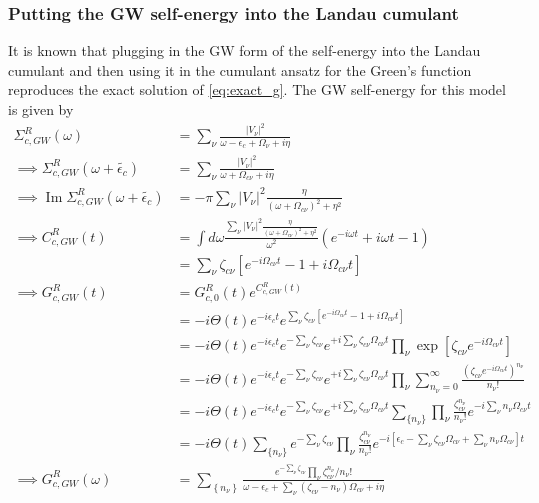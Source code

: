 \subsubsection{Putting the GW self-energy into the Landau cumulant}
 It is known that plugging in the GW form of the self-energy into the Landau cumulant and then using it in the cumulant ansatz for the Green's function reproduces the exact solution of \ref{eq:exact_g}. The GW self-energy for this model is given by
\begin{align}
    \Sigma^R_{c,GW}(\omega) &= \sum_\nu \frac{|V_\nu|^2}{\omega - \epsilon_c + \Omega_\nu + i\eta}\\
\implies \Sigma^R_{c,GW}(\omega+\tilde{\epsilon_c}) &= \sum_\nu \frac{|V_\nu|^2}{\omega + \Omega_{c\nu} + i\eta} \\
\implies \operatorname{Im} \Sigma^R_{c,GW}(\omega+\tilde{\epsilon_c}) &= -\pi \sum_\nu |V_\nu|^2 \frac{\eta}{(\omega + \Omega_{c\nu})^2 + \eta^2} \\
\implies C^R_{c,GW}(t) &= \int d\omega \frac{\sum_\nu |V_\nu|^2 \frac{\eta}{(\omega + \Omega_{c\nu})^2 + \eta^2}}{\omega^2} \left( e^{-i\omega t} + i\omega t - 1 \right)\\
&= \sum_{\nu} \zeta_{c\nu} \left[ e^{-i\Omega_{c\nu} t} - 1 + i\Omega_{c\nu} t \right]
\label{eq:Cpp_2} \\
\implies G^R_{c,GW}(t) &= G_{c,0}^R(t) e^{C_{c,GW}^R(t)} \\
&=
-i\Theta(t)e^{-i\epsilon_c t}
e^{\sum_{\nu}\zeta_{c\nu}
\left[
e^{-i\Omega_{c\nu}t}
-1
+i\Omega_{c\nu}t
\right]}
\\
&=
-i\Theta(t)e^{-i\epsilon_c t}
e^{-\sum_\nu \zeta_{c\nu}}
e^{+i\sum_\nu \zeta_{c\nu}\Omega_{c\nu}t}
\prod_\nu
\exp\left[
\zeta_{c\nu}e^{-i\Omega_{c\nu}t}
\right]
\\
&=
-i\Theta(t)e^{-i\epsilon_c t}
e^{-\sum_\nu \zeta_{c\nu}}
e^{+i\sum_\nu \zeta_{c\nu}\Omega_{c\nu}t}
\prod_\nu
\sum_{n_\nu=0}^{\infty}
\frac{
\left(
\zeta_{c\nu}e^{-i\Omega_{c\nu}t}
\right)^{n_\nu}
}{n_\nu!}
\\
&=
-i\Theta(t)e^{-i\epsilon_c t}
e^{-\sum_\nu \zeta_{c\nu}}
e^{+i\sum_\nu \zeta_{c\nu}\Omega_{c\nu}t}
\sum_{\{n_\nu\}}
\prod_\nu
\frac{\zeta_{c\nu}^{n_\nu}}{n_\nu!}
e^{-i\sum_\nu n_\nu\Omega_{c\nu}t}
\\
&=
-i \Theta(t)
\sum_{\{n_\nu\}}
e^{-\sum_\nu \zeta_{c\nu}}
\prod_\nu
\frac{\zeta_{c\nu}^{n_\nu}}{n_\nu!}
e^{-i\left[
\epsilon_c
-\sum_\nu \zeta_{c\nu}\Omega_{c\nu}
+\sum_\nu n_\nu\Omega_{c\nu}
\right]t}\\
\implies G^R_{c,GW}(\omega) &= \sum_{\left\{n_\nu\right\}} \frac{e^{-\sum_\nu \zeta_{c\nu}} \prod_\nu \zeta_{c\nu}^{n_\nu} / n_{\nu}!}{\omega-\epsilon_c+\sum_\nu (\zeta_{c\nu} - n_\nu) \Omega_{c\nu}+i \eta}
\end{align}
